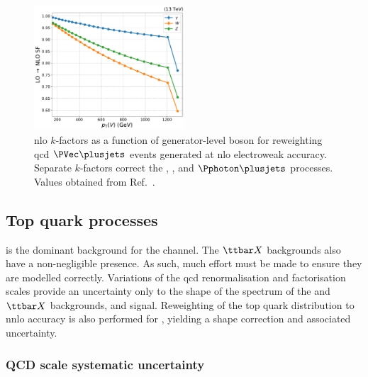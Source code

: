 \begin{figure}[htbp]
    \centering
    \includegraphics[width=0.5\textwidth]{figures/nlo_k_factors/1D_all_ewk.pdf}
    \caption[NLO $k$-factors as a function of generator-level boson \pt for reweighting QCD $\PVec \plusjets$ events generated at LO electroweak accuracy]{\acrshort{nlo} $k$-factors as a function of generator-level boson \pt for reweighting \acrshort{qcd} $\PVec \plusjets$ events generated at \acrshort{nlo} electroweak accuracy. Separate $k$-factors correct the \PW, \PZ, and $\Pphoton\plusjets$ processes. Values obtained from Ref.~.}
    \label{fig:htoinv_nlo_k_factor_ewk}
\end{figure}




\subsection{Top quark processes}
\label{subsec:htoinv_ttbar_uncerts}

\ttbarpjets is the dominant background for the \ttH channel. The $\ttbar X$ backgrounds also have a non-negligible presence. As such, much effort must be made to ensure they are modelled correctly. Variations of the \acrshort{qcd} renormalisation and factorisation scales provide an uncertainty only to the shape of the \ptmiss spectrum of the \ttbar and $\ttbar X$ backgrounds, and \ttH signal. Reweighting of the top quark \pt distribution to \acrshort{nnlo} accuracy is also performed for \ttbar, yielding a shape correction and associated uncertainty.




\subsubsection{QCD scale systematic uncertainty}
\label{subsubsec:ttbar_renorm_fact_scale_uncert}

